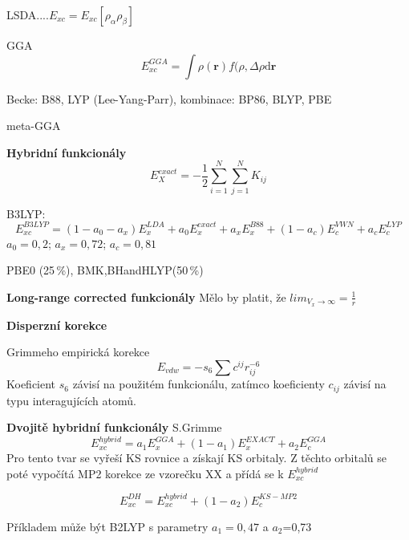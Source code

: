 LSDA....$E_{xc}=E_{xc}[\rho_\alpha\rho_\beta]$ 

GGA 
\begin{equation}
E_{xc}^{GGA}=\int \rho(\textbf{r})f(\rho,\Delta\rho\mathrm{d}\textbf{r} 
\end{equation}

Becke: B88, LYP (Lee-Yang-Parr),
kombinace: BP86, BLYP, PBE

meta-GGA

\textbf{Hybridní funkcionály}
\begin{equation}
E_X^{exact}=-\frac{1}{2}\sum_{i=1}^N\sum_{j=1}^N K_{ij}
\end{equation}

B3LYP:
\begin{equation}
E_{xc}^{B3LYP}=(1-a_0-a_x)E_x^{LDA}+a_0E_x^{exact}+a_xE_x^{B88}+(1-a_c)E_c^{VWN}+a_c E_c^{LYP}
\end{equation}
$a_0=0,2$; $a_x=0,72$; $a_c=0,81$

PBE0 (25\,\%), BMK,BHandHLYP(50\,\%)

\textbf{Long-range corrected funkcionály}
Mělo by platit, že $lim_{V_x\to \infty}=\frac{1}{r}$

\textbf{Disperzní korekce}

Grimmeho empirická korekce
\begin{equation}
E_{vdw}=-s_6\sum c^{ij}r_{ij}^{-6}
\end{equation}
Koeficient $s_6$ závisí na použitém funkcionálu, zatímco koeficienty $c_{ij}$ závisí na typu interagujících atomů.

\textbf{Dvojitě hybridní funkcionály}
S.Grimme 
\begin{equation}
E_{xc}^{hybrid}=a_1E_x^{GGA}+(1-a_1)E_x^{EXACT}+a_2E_c^{GGA}
\end{equation}
Pro tento tvar se vyřeší KS rovnice a získají KS orbitaly. Z těchto orbitalů se poté vypočítá MP2 korekce
ze vzorečku XX a přídá se k $E_{xc}^{hybrid}$

\begin{equation}
E_{xc}^{DH}=E_{xc}^{hybrid}+(1-a_2)E_c^{KS-MP2}
\end{equation}

Příkladem může být B2LYP s parametry $a_1=0,47$ a $a_2$=0,73

